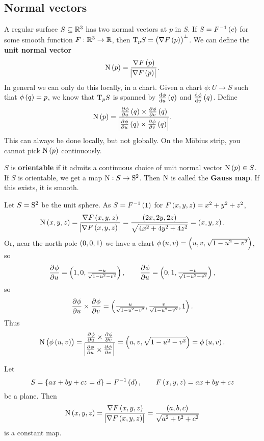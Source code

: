 \pagebreak

\subsection{Normal vectors}

A regular surface $ S \subseteq \RR^3 $ has two normal vectors at $ p $ in $ S $. If $ S = F^{-1}\br{c} $ for some smooth function $ F : \RR^3 \to \RR $, then $ \T_p S = \br{\nabla F\br{p}}^\perp $. We can define the \textbf{unit normal vector}
$$ \N\br{p} = \dfrac{\nabla F\br{p}}{\abs{\nabla F\br{p}}}. $$
In general we can only do this locally, in a chart. Given a chart $ \phi : U \to S $ such that $ \phi\br{q} = p $, we know that $ \T_p S $ is spanned by $ \tod{\phi}{u}\br{q} $ and $ \tod{\phi}{v}\br{q} $. Define
$$ \N\br{p} = \dfrac{\tpd{\phi}{u}\br{q} \times \tpd{\phi}{v}\br{q}}{\abs{\tpd{\phi}{u}\br{q} \times \tpd{\phi}{v}\br{q}}}. $$
This can always be done locally, but not globally. On the M\"obius strip, you cannot pick $ \N\br{p} $ continuously.

\begin{definition}
$ S $ is \textbf{orientable} if it admits a continuous choice of unit normal vector $ \N\br{p} \in S $. If $ S $ is orientable, we get a map $ \N : S \to \S^2 $. Then $ \N $ is called the \textbf{Gauss map}. If this exists, it is smooth.
\end{definition}

\begin{example*}
Let $ S = \S^2 $ be the unit sphere. As $ S = F^{-1}\br{1} $ for $ F\br{x, y, z} = x^2 + y^2 + z^2 $,
$$ \N\br{x, y, z} = \dfrac{\nabla F\br{x, y, z}}{\abs{\nabla F\br{x, y, z}}} = \dfrac{\br{2x, 2y, 2z}}{\sqrt{4x^2 + 4y^2 + 4z^2}} = \br{x, y, z}. $$
Or, near the north pole $ \br{0, 0, 1} $ we have a chart $ \phi\br{u, v} = \br{u, v, \sqrt{1 - u^2 - v^2}} $, so
$$ \dpd{\phi}{u} = \br{1, 0, \tfrac{-u}{\sqrt{1 - u^2 - v^2}}}, \qquad \dpd{\phi}{u} = \br{0, 1, \tfrac{-v}{\sqrt{1 - u^2 - v^2}}}, $$
so
$$ \dpd{\phi}{u} \times \dpd{\phi}{v} = \br{\tfrac{u}{\sqrt{1 - u^2 - v^2}}, \tfrac{v}{\sqrt{1 - u^2 - v^2}}, 1}. $$
Thus
$$ \N\br{\phi\br{u, v}} = \dfrac{\tpd{\phi}{u} \times \tpd{\phi}{v}}{\abs{\tpd{\phi}{u} \times \tpd{\phi}{v}}} = \br{u, v, \sqrt{1 - u^2 - v^2}} = \phi\br{u, v}. $$
\end{example*}

\begin{example*}
Let
$$ S = \cbr{ax + by + cz = d} = F^{-1}\br{d}, \qquad F\br{x, y, z} = ax + by + cz $$
be a plane. Then
$$ \N\br{x, y, z} = \dfrac{\nabla F\br{x, y, z}}{\abs{\nabla F\br{x, y, z}}} = \dfrac{\br{a, b, c}}{\sqrt{a^2 + b^2 + c^2}} $$
is a constant map.
\end{example*}

